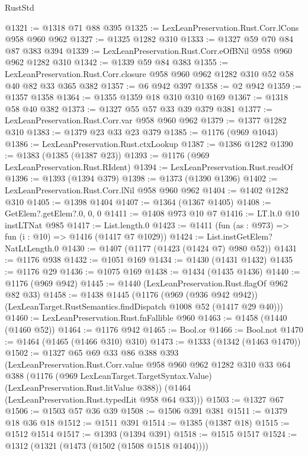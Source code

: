 \begin{lexlean}{RustStd}
\begin{coremodule}
@1321 := @1318 @71 @88 @395
@1325 := LexLeanPreservation.Rust.Corr.lCons @958 @960 @962
@1327 := @1325 @1282 @310
@1333 := @1327 @59 @70 @84 @87 @383 @394
@1339 := LexLeanPreservation.Rust.Corr.eOfBNil @958 @960 @962 @1282 @310
@1342 := @1339 @59 @84 @383
@1355 := LexLeanPreservation.Rust.Corr.closure
    @958
    @960
    @962
    @1282
    @310
    @52
    @58
    @40
    @82
    @33
    @365
    @382
@1357 := @6 @942 @397
@1358 := @2 @942
@1359 := @1357 @1358
@1364 := @1355 @1359 @18 @310 @310 @169
@1367 := @1318 @58 @40 @382
@1373 := @1327 @55 @57 @33 @39 @379 @381
@1377 := LexLeanPreservation.Rust.Corr.var @958 @960 @962
@1379 := @1377 @1282 @310
@1383 := @1379 @23 @33 @23 @379
@1385 := @1176 (@969 @1043)
@1386 := LexLeanPreservation.Rust.ctxLookup
@1387 := @1386 @1282
@1390 := @1383 (@1385 (@1387 @23))
@1393 := @1176 (@969 LexLeanPreservation.Rust.RIdent)
@1394 := LexLeanPreservation.Rust.readOf
@1396 := @1393 (@1394 @379)
@1398 := @1373 (@1390 @1396)
@1402 := LexLeanPreservation.Rust.Corr.lNil @958 @960 @962
@1404 := @1402 @1282 @310
@1405 := @1398 @1404
@1407 := @1364 (@1367 @1405)
@1408 := GetElem?.getElem?.{0, 0, 0}
@1411 := @1408 @973 @10 @7
@1416 := LT.lt.{0} @10 instLTNat @985
@1417 := List.length.{0}
@1423 := @1411 (fun (as : @973) => fun (i : @10) => @1416 (@1417 @7 @1029))
@1424 := List.instGetElem?NatLtLength.{0}
@1430 := @1407 (@1177 (@1423 (@1424 @7) @980 @52))
@1431 := @1176 @938
@1432 := @1051 @169
@1434 := @1430 (@1431 @1432)
@1435 := @1176 @29
@1436 := @1075 @169
@1438 := @1434 (@1435 @1436)
@1440 := @1176 (@969 @942)
@1445 := @1440 (LexLeanPreservation.Rust.flagOf @962 @82 @33)
@1458 := @1438
    @1445
    (@1176
      (@969 (@936 @942 @942))
      (LexLeanTarget.RustSemantics.findDispatch @1008 @52 (@1417 @29 @40)))
@1460 := LexLeanPreservation.Rust.fnFallible @960
@1463 := @1458 (@1440 (@1460 @52))
@1464 := @1176 @942
@1465 := Bool.or
@1466 := Bool.not
@1470 := @1464 (@1465 (@1466 @310) @310)
@1473 := @1333 (@1342 (@1463 @1470))
@1502 := @1327
    @65
    @69
    @33
    @86
    @388
    @393
    (LexLeanPreservation.Rust.Corr.value
      @958
      @960
      @962
      @1282
      @310
      @33
      @64
      @388
      (@1176 (@969 LexLeanTarget.TargetSyntax.Value) (LexLeanPreservation.Rust.litValue @388))
      (@1464 (LexLeanPreservation.Rust.typedLit @958 @64 @33)))
@1503 := @1327 @67
@1506 := @1503 @57 @36 @39
@1508 := @1506 @391 @381
@1511 := @1379 @18 @36 @18
@1512 := @1511 @391
@1514 := @1385 (@1387 @18)
@1515 := @1512 @1514
@1517 := @1393 (@1394 @391)
@1518 := @1515 @1517
@1524 := @1312 (@1321 (@1473 (@1502 (@1508 @1518 @1404))))

\end{coremodule}
\end{lexlean}
